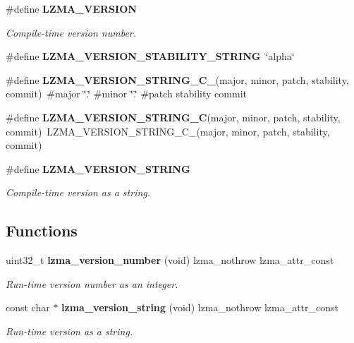 \begin{DoxyCompactItemize}
\item 
\#define {\bf L\-Z\-M\-A\-\_\-\-V\-E\-R\-S\-I\-O\-N}
\begin{DoxyCompactList}\small\item\em Compile-\/time version number. \end{DoxyCompactList}\item 
\#define {\bfseries L\-Z\-M\-A\-\_\-\-V\-E\-R\-S\-I\-O\-N\-\_\-\-S\-T\-A\-B\-I\-L\-I\-T\-Y\-\_\-\-S\-T\-R\-I\-N\-G}~\char`\"{}alpha\char`\"{}\label{version_8h_a55a97e55fedce2c148796047ddc88c96}

\item 
\#define {\bfseries L\-Z\-M\-A\-\_\-\-V\-E\-R\-S\-I\-O\-N\-\_\-\-S\-T\-R\-I\-N\-G\-\_\-\-C\-\_\-}(major, minor, patch, stability, commit)~\#major \char`\"{}.\char`\"{} \#minor \char`\"{}.\char`\"{} \#patch stability commit\label{version_8h_a0b89024f7a04da9b754abee2afe6df23}

\item 
\#define {\bfseries L\-Z\-M\-A\-\_\-\-V\-E\-R\-S\-I\-O\-N\-\_\-\-S\-T\-R\-I\-N\-G\-\_\-\-C}(major, minor, patch, stability, commit)~L\-Z\-M\-A\-\_\-\-V\-E\-R\-S\-I\-O\-N\-\_\-\-S\-T\-R\-I\-N\-G\-\_\-\-C\-\_\-(major, minor, patch, stability, commit)\label{version_8h_ad5614eaf4c2e9408a99bc2137c65ed17}

\item 
\#define {\bf L\-Z\-M\-A\-\_\-\-V\-E\-R\-S\-I\-O\-N\-\_\-\-S\-T\-R\-I\-N\-G}
\begin{DoxyCompactList}\small\item\em Compile-\/time version as a string. \end{DoxyCompactList}\end{DoxyCompactItemize}
\subsection*{Functions}
\begin{DoxyCompactItemize}
\item 
uint32\-\_\-t {\bf lzma\-\_\-version\-\_\-number} (void) lzma\-\_\-nothrow lzma\-\_\-attr\-\_\-const
\begin{DoxyCompactList}\small\item\em Run-\/time version number as an integer. \end{DoxyCompactList}\item 
const char $\ast$ {\bf lzma\-\_\-version\-\_\-string} (void) lzma\-\_\-nothrow lzma\-\_\-attr\-\_\-const
\begin{DoxyCompactList}\small\item\em Run-\/time version as a string. \end{DoxyCompactList}\end{DoxyCompactItemize}


